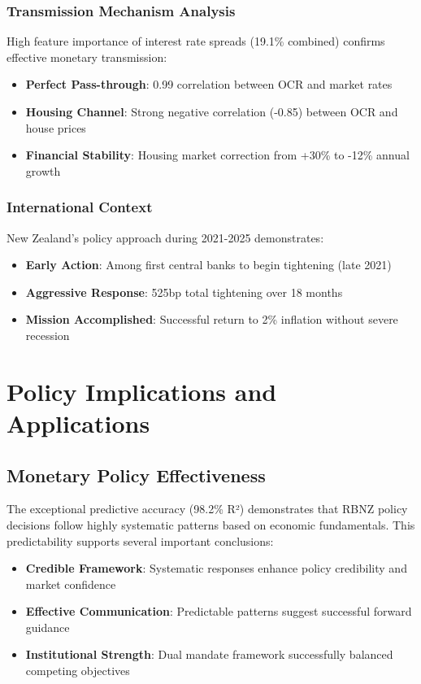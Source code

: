 \documentclass[11pt,a4paper]{article}
\begin{document}
	\subsubsection{Transmission Mechanism Analysis}
	High feature importance of interest rate spreads (19.1\% combined) confirms effective monetary transmission:
	\begin{itemize}
		\item \textbf{Perfect Pass-through}: 0.99 correlation between OCR and market rates
		\item \textbf{Housing Channel}: Strong negative correlation (-0.85) between OCR and house prices
		\item \textbf{Financial Stability}: Housing market correction from +30\% to -12\% annual growth
	\end{itemize}
	
	\subsubsection{International Context}
	New Zealand's policy approach during 2021-2025 demonstrates:
	\begin{itemize}
		\item \textbf{Early Action}: Among first central banks to begin tightening (late 2021)
		\item \textbf{Aggressive Response}: 525bp total tightening over 18 months
		\item \textbf{Mission Accomplished}: Successful return to 2\% inflation without severe recession
	\end{itemize}
	
	\section{Policy Implications and Applications}
	
	\subsection{Monetary Policy Effectiveness}
	The exceptional predictive accuracy (98.2\% R²) demonstrates that RBNZ policy decisions follow highly systematic patterns based on economic fundamentals. This predictability supports several important conclusions:
	
	\begin{itemize}
		\item \textbf{Credible Framework}: Systematic responses enhance policy credibility and market confidence
		\item \textbf{Effective Communication}: Predictable patterns suggest successful forward guidance
		\item \textbf{Institutional Strength}: Dual mandate framework successfully balanced competing objectives
	\end{itemize}
	
\end{document}
